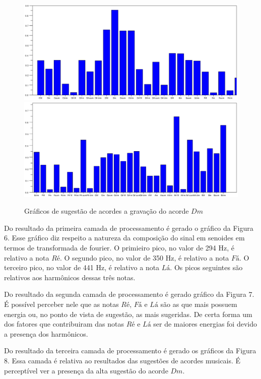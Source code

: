 \begin{figure}[h]
	\centering
		\includegraphics[keepaspectratio=true,scale=0.49]{figuras/Dm/acordes_1_Dm.eps}
		\includegraphics[keepaspectratio=true,scale=0.49]{figuras/Dm/acordes_2_Dm.eps}
	\caption{Gráficos de sugestão de acordes a gravação do acorde $Dm$}
\end{figure}
\newpage

Do resultado da primeira camada de processamento é gerado o gráfico da Figura 6. Esse gráfico diz respeito a natureza da composição do sinal em senoides em termos de transformada de fourier. O primieiro pico, no valor de 294 Hz, é relativo a nota $Ré$. O segundo pico, no valor de 350 Hz, é relativo a nota $Fá$. O terceiro pico, no valor de 441 Hz, é relativo a nota $Lá$. Os picos seguintes são relativos aos harmônicos dessas três notas. 

Do resultado da segunda camada de processamento é gerado gráfico da Figura 7. É possível perceber nele que as notas $Ré$, $Fá$ e $Lá$ são as que mais possuem energia ou, no ponto de vista de sugestão, as mais sugeridas. De certa forma um dos fatores que contribuiram das notas $Ré$ e $Lá$ ser de maiores energias foi devido a presença dos harmônicos.

Do resultado da terceira camada de processamento é gerado os gráficos da Figura 8. Essa camada é relativa ao resultados das sugestões de acordes musicais. É perceptível ver a presença da alta sugestão do acorde $Dm$.

